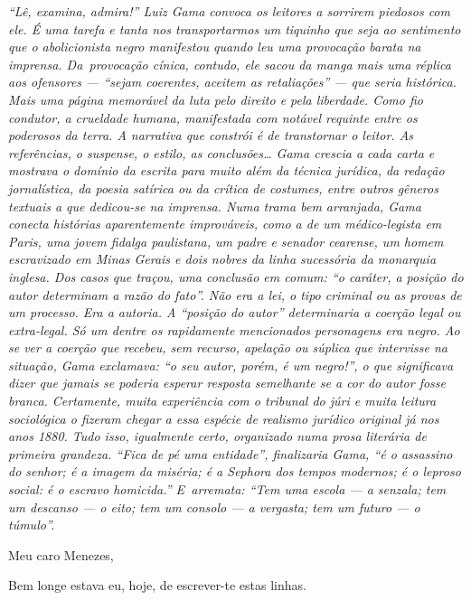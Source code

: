 \begin{resumo}
\emph{``Lê, examina, admira!'' Luiz Gama convoca os leitores a sorrirem
piedosos com ele. É uma tarefa e tanta nos transportarmos um tiquinho
que seja ao sentimento que o abolicionista negro manifestou quando leu
uma provocação barata na imprensa. Da~provocação cínica, contudo, ele
sacou da manga mais uma réplica aos ofensores --- ``sejam coerentes,
aceitem as retaliações'' --- que seria histórica. Mais uma página
memorável da luta pelo direito e pela liberdade. Como fio condutor, a
crueldade humana, manifestada com notável requinte entre os poderosos da
terra. A narrativa que constrói é de transtornar o leitor. As
referências, o suspense, o estilo, as conclusões\ldots{} Gama crescia a cada
carta e mostrava o domínio da escrita para muito além da técnica
jurídica, da redação jornalística, da poesia satírica ou da crítica de
costumes, entre outros gêneros textuais a que dedicou-se na imprensa.
Numa trama bem arranjada, Gama conecta histórias aparentemente
improváveis, como a de um médico-legista em Paris, uma jovem fidalga
paulistana, um padre e senador cearense, um homem escravizado em Minas
Gerais e dois nobres da linha sucessória da monarquia inglesa. Dos casos
que traçou, uma conclusão em comum: ``o caráter, a posição do autor
determinam a razão do fato''. Não era a lei, o tipo criminal ou as provas
de um processo. Era a autoria. A ``posição do autor'' determinaria a
coerção legal ou extra-legal. Só um dentre os rapidamente mencionados
personagens era negro. Ao se ver a coerção que recebeu, sem recurso,
apelação ou súplica que intervisse na situação, Gama exclamava: ``o seu
autor, porém, é um negro!'', o que significava dizer que jamais se
poderia esperar resposta semelhante se a cor do autor fosse branca.
Certamente, muita experiência com o tribunal do júri e muita leitura
sociológica o fizeram chegar a essa espécie de realismo jurídico
original já nos anos 1880. Tudo isso, igualmente certo, organizado numa
prosa literária de primeira grandeza. ``Fica de pé uma entidade'',
finalizaria Gama, ``é o assassino do senhor; é a imagem da miséria; é a
Sephora dos tempos modernos; é o leproso social: é o escravo homicida.''
E~arremata: ``Tem uma escola --- a senzala; tem um descanso --- o eito; tem
um consolo --- a vergasta; tem um futuro --- o túmulo''. }
\end{resumo}

Meu caro Menezes,

Bem longe estava eu, hoje, de escrever-te estas linhas.


